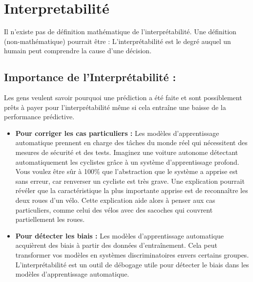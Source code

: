 \setlength{\parindent}{0}

\section{Interpretabilité}


Il n'existe pas de définition mathématique de l'interprétabilité. Une définition (non-mathématique) pourrait être : 
L'interprétabilité est le degré auquel un humain peut comprendre la cause d'une décision.

\subsection{Importance de l'Interprétabilité :}

Les gens veulent savoir pourquoi une prédiction a été faite et sont possiblement prêts à payer pour l'interprétabilité même si cela entraîne une baisse de la performance prédictive.
\begin{itemize}
    \item
     \textbf{Pour corriger les cas particuliers :} Les modèles d'apprentissage automatique prennent en charge des tâches du monde réel qui nécessitent des mesures de sécurité et des tests. Imaginez une voiture autonome détectant automatiquement les cyclistes grâce à un système d'apprentissage profond. Vous voulez être sûr à 100\% que l'abstraction que le système a apprise est sans erreur, car renverser un cycliste est très grave. Une explication pourrait révéler que la caractéristique la plus importante apprise est de reconnaître les deux roues d'un vélo. Cette explication aide alors à penser aux cas particuliers, comme celui des vélos avec des sacoches qui couvrent partiellement les roues.    
     \item
     \textbf{Pour détecter les biais :} Les modèles d'apprentissage automatique acquièrent des biais à partir des données d'entraînement. Cela peut transformer vos modèles en systèmes discriminatoires envers certains groupes. L'interprétabilité est un outil de débogage utile pour détecter le biais dans les modèles d'apprentissage automatique.
\end{itemize}

